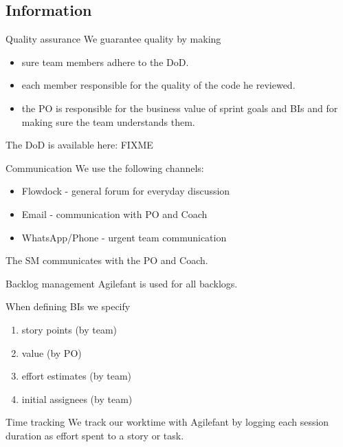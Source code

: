 \documentclass{beamer}
\begin{document}
\subsection{Information}
\begin{frame}{Quality assurance}
  We guarantee quality by making

  \begin{itemize}
  \item sure team members adhere to the DoD.
  \item each member responsible for the quality of the code he reviewed.
  \item the PO is responsible for the business value of sprint goals and
  BIs and for making sure the team understands them.
  \end{itemize}

  The DoD is available here: FIXME
\end{frame}
\begin{frame}{Communication}
  We use the following channels:

  \begin{itemize}
  \item Flowdock - general forum for everyday discussion
  \item Email - communication with PO and Coach
  \item WhatsApp/Phone - urgent team communication
  \end{itemize}

  The SM communicates with the PO and Coach.
\end{frame}
\begin{frame}{Backlog management}
  Agilefant is used for all backlogs.
  
  When defining BIs we specify

  \begin{enumerate}
  \item story points (by team)
  \item value (by PO)
  \item effort estimates (by team)
  \item initial assignees (by team)
  \end{enumerate}
\end{frame}
\begin{frame}{Time tracking}
  We track our worktime with Agilefant by logging each session
  duration as effort spent to a story or task.
\end{frame}
\end{document}
